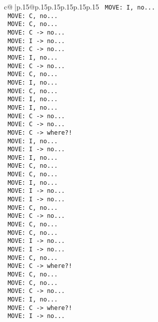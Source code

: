 \documentclass{article}
\begin{document}
{\begin{supertabular}{c@{$\;$}|p{.15\linewidth}@{}p{.15\linewidth}p{.15\linewidth}p{.15\linewidth}p{.15\linewidth}p{.15\linewidth}}
{{{\texttt{ MOVE: I, no...} \\
\texttt{ MOVE: C, no...} \\
\texttt{ MOVE: C, no...} \\
\texttt{ MOVE: C {-}> no...} \\
\texttt{ MOVE: I {-}> no...} \\
\texttt{ MOVE: C {-}> no...} \\
\texttt{ MOVE: I, no...} \\
\texttt{ MOVE: C {-}> no...} \\
\texttt{ MOVE: C, no...} \\
\texttt{ MOVE: I, no...} \\
\texttt{ MOVE: C, no...} \\
\texttt{ MOVE: I, no...} \\
\texttt{ MOVE: I, no...} \\
\texttt{ MOVE: C {-}> no...} \\
\texttt{ MOVE: C {-}> no...} \\
\texttt{ MOVE: C {-}> where?!} \\
\texttt{ MOVE: I, no...} \\
\texttt{ MOVE: I {-}> no...} \\
\texttt{ MOVE: I, no...} \\
\texttt{ MOVE: C, no...} \\
\texttt{ MOVE: C, no...} \\
\texttt{ MOVE: I, no...} \\
\texttt{ MOVE: I {-}> no...} \\
\texttt{ MOVE: I {-}> no...} \\
\texttt{ MOVE: C, no...} \\
\texttt{ MOVE: C {-}> no...} \\
\texttt{ MOVE: C, no...} \\
\texttt{ MOVE: C, no...} \\
\texttt{ MOVE: I {-}> no...} \\
\texttt{ MOVE: I {-}> no...} \\
\texttt{ MOVE: C, no...} \\
\texttt{ MOVE: C {-}> where?!} \\
\texttt{ MOVE: C, no...} \\
\texttt{ MOVE: C, no...} \\
\texttt{ MOVE: C {-}> no...} \\
\texttt{ MOVE: I, no...} \\
\texttt{ MOVE: C {-}> where?!} \\
\texttt{ MOVE: I {-}> no...} \\
}}}
\end{supertabular}}
\end{document}
